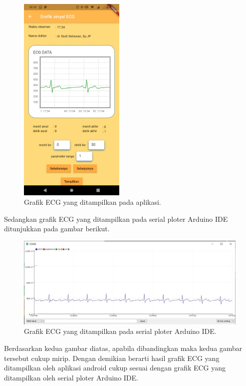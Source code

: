 \begin{figure}[H] \centering
	\includegraphics[width=0.45\textwidth]{img/grafikECGapps.jpg}
	\caption{Grafik ECG yang ditampilkan pada aplikasi.}
	\label{fig:4.0}
\end{figure}
Sedangkan grafik ECG yang ditampilkan pada serial ploter Arduino IDE ditunjukkan pada gambar berikut.
\begin{figure}[H] \centering
	\includegraphics[width=1\textwidth]{img/ujisesuaidataIDE.jpg}
	\caption{Grafik ECG yang ditampilkan pada serial ploter Arduino IDE.}
	\label{fig:4.1}
\end{figure}

Berdasarkan kedua gambar diatas, apabila dibandingkan maka kedua gambar tersebut cukup mirip. Dengan demikian berarti hasil grafik ECG yang ditampilkan oleh aplikasi android cukup sesuai dengan grafik ECG yang ditampilkan oleh serial ploter Arduino IDE.
\vspace{1ex}

